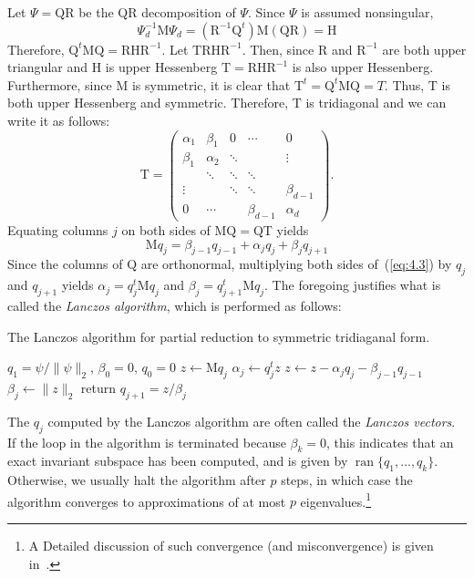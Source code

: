 \documentclass[12pt,letterpaper]{report}
\theoremstyle{plain}
\theoremstyle{definition}
\theoremstyle{remark}
\numberwithin{theorem}{chapter}
\numberwithin{claim}{chapter}
\numberwithin{equation}{chapter}
\numberwithin{conjecture}{chapter}
\newcommand\M{\ensuremath{\mathrm{M}}}
\renewcommand\H{\ensuremath{\mathrm{H}}}
\newcommand\T{\ensuremath{\mathrm{T}}}
\newcommand\Q{\ensuremath{\mathrm{Q}}}
\newcommand\mR{\ensuremath{\mathrm{R}}}
\newcommand\ran{\ensuremath{\operatorname{ran}}}
\newcommand\<{\ensuremath{\langle}}
\renewcommand\>{\ensuremath{\rangle}}
\begin{document}
Let $\Psi = \Q\mR$ be the QR decomposition of $\Psi$. Since $\Psi$ is assumed nonsingular,
\[
\Psi_d^{-1}\M \Psi_d = (\mR^{-1}\Q^t)\M(\Q\mR) = \H
\]
Therefore, $\Q^t\M\Q = \mR\H\mR^{-1}$.  Let $\T \mR\H\mR^{-1}$.  Then, since $\mR$
and $\mR^{-1}$ are both upper triangular and $\H$ is upper Hessenberg $\T = \mR\H\mR^{-1}$ is also upper
Hessenberg. Furthermore, since $\M$ is symmetric, it is clear that 
$\T^t =\Q^t\M\Q = T$. Thus, $\T$ is both upper Hessenberg and symmetric. Therefore,
$\T$ is tridiagonal and we can write it as follows:
\begin{equation}
  \label{eq:4.2}
\T = 
\begin{pmatrix}
\alpha_1 & \beta_1 &      0 & \cdots & 0 \\
\beta_1  & \alpha_2 & \ddots &        & \vdots\\
         & \ddots & \ddots & \ddots   &\\
\vdots   &       &  \ddots & \ddots & \beta_{d-1}\\
0  &   \cdots    &   & \beta_{d-1} &\alpha_d
\end{pmatrix}.
\end{equation}
%
%
%
%
Equating columns $j$ on both sides of $\M\Q = \Q\T$ yields
\begin{equation}
\label{eq:4.3}
\M q_j = \beta_{j-1}q_{j-1}+\alpha_j q_j + \beta_j q_{j+1}
\end{equation}
Since the columns of $\Q$ are orthonormal, multiplying both sides 
of~(\ref{eq:4.3})
by $q_j$ and $q_{j+1}$ yields
$\alpha_j = q_j^t \M q_j$ and $\beta_j = q_{j+1}^t \M q_j$.
The foregoing justifies what is called the \emph{Lanczos algorithm}, which is performed as follows:
         \begin{algorithm}
           \caption{The Lanczos algorithm for partial reduction to symmetric
             tridiaganal form.}
           \begin{algorithmic}
             \STATE $q_1 = \psi/\|\psi\|_2$, $\beta_0 = 0$, $q_0= 0$
             \STATE $z \leftarrow \M q_j$
             \STATE $\alpha_j \leftarrow q_j^tz$
             \STATE $z \leftarrow z - \alpha_j q_j - \beta_{j-1} q_{j-1}$
             \STATE $\beta_j \leftarrow \|z\|_2$
             \STATE return
             \ENDIF
             \STATE $q_{j+1} = z/\beta_j$
             \ENDFOR
           \end{algorithmic}
         \end{algorithm}
The $q_j$ computed by the Lanczos algorithm are often called the \emph{Lanczos vectors}. If the
loop in the algorithm is terminated because $\beta_{k}= 0$, this indicates that
an exact invariant subspace has been computed, and is given by 
$\ran\{q_1, \dots, q_k\}$. Otherwise, we usually halt the algorithm after 
$p$ steps, in which case the algorithm converges to approximations of at most
  $p$ eigenvalues.\footnote{A Detailed discussion of such convergence (and
    misconvergence) is given in~\cite{Demmel:1997}.}
\end{document}
